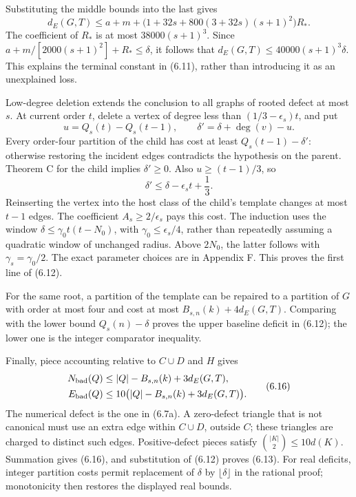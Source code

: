 \documentclass[english,11pt,a4paper]{article}
\begin{document}
Substituting the middle bounds into the last gives \[
d_E(G,T)\le a+m+
\bigl(1+32s+800(3+32s)(s+1)^2\bigr)R_*.
\] The coefficient of \(R_*\) is at most \(38000(s+1)^3\). Since \(a+m/[2000(s+1)^2]+R_*\le\delta\), it follows that \(d_E(G,T)\le40000(s+1)^3\delta\). This explains the terminal constant in (6.11), rather than introducing it as an unexplained loss.

Low-degree deletion extends the conclusion to all graphs of rooted defect at most \(s\). At current order \(t\), delete a vertex of degree less than \((1/3-\epsilon_s)t\), and put \[
u=Q_s(t)-Q_s(t-1),\qquad
\delta'=\delta+\deg(v)-u.
\tag{6.15}
\] Every order-four partition of the child has cost at least \(Q_s(t-1)-\delta'\): otherwise restoring the incident edges contradicts the hypothesis on the parent. Theorem C for the child implies \(\delta'\ge0\). Also \(u\ge(t-1)/3\), so \[
\delta'\le\delta-\epsilon_s t+\frac13.
\] Reinserting the vertex into the host class of the child's template changes at most \(t-1\) edges. The coefficient \(A_s\ge2/\epsilon_s\) pays this cost. The induction uses the window \(\delta\le\gamma_0t(t-N_0)\), with \(\gamma_0\le\epsilon_s/4\), rather than repeatedly assuming a quadratic window of unchanged radius. Above \(2N_0\), the latter follows with \(\gamma_s=\gamma_0/2\). The exact parameter choices are in Appendix F. This proves the first line of (6.12).

For the same root, a partition of the template can be repaired to a partition of \(G\) with order at most four and cost at most \(B_{s,n}(k)+4d_E(G,T)\). Comparing with the lower bound \(Q_s(n)-\delta\) proves the upper baseline deficit in (6.12); the lower one is the integer comparator inequality.

Finally, piece accounting relative to \(C\cup D\) and \(H\) gives \[
\begin{aligned}
N_{\rm bad}(Q)&\le |Q|-B_{s,n}(k)+3d_E(G,T),\\
E_{\rm bad}(Q)&\le10\bigl(|Q|-B_{s,n}(k)+3d_E(G,T)\bigr).
\end{aligned}
\tag{6.16}
\] The numerical defect is the one in (6.7a). A zero-defect triangle that is not canonical must use an extra edge within \(C\cup D\), outside \(C\); these triangles are charged to distinct such edges. Positive-defect pieces satisfy \(\binom{|K|}{2}\le10d(K)\). Summation gives (6.16), and substitution of (6.12) proves (6.13). For real deficits, integer partition costs permit replacement of \(\delta\) by \(\lfloor\delta\rfloor\) in the rational proof; monotonicity then restores the displayed real bounds.
\end{document}
